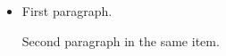 \documentclass{article}
\begin{document}
\begin{itemize}
\item First paragraph.

Second paragraph in the same item.
\end{itemize}
\end{document}
